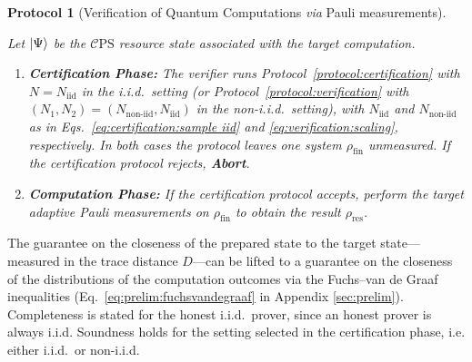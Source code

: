 \documentclass[a4paper,twocolumn,11pt,unpublished]{../../revision/quantumarticle}
\newtheorem{protocol}{Protocol}
\newcommand{\Niid}{N_{\mathrm{iid}}}
\newcommand{\Nnoniid}{N_{\mathrm{non\text{-}iid}}}
\newcommand{\mCEPS}{\mathcal{C}\text{PS}}
\begin{document}
\begin{protocol}[Verification of Quantum Computations \textit{via} Pauli measurements]
    \label{protocol:verification of UQC}

    Let $\ket\Psi$ be the $\mCEPS$ resource state associated with the target computation.

    \begin{enumerate}

        \item \textbf{Certification Phase:}
        The verifier runs Protocol~\ref{protocol:certification} with $N = \Niid$ in the i.i.d.\ setting (or Protocol~\ref{protocol:verification} with $(N_1,N_2) = (\Nnoniid,\Niid)$ in the non-i.i.d.\ setting), with $\Niid$ and $\Nnoniid$ as in Eqs.~\eqref{eq:certification:sample iid} and \eqref{eq:verification:scaling}, respectively. In both cases the protocol leaves one system $\rho_{\mathrm{fin}}$ unmeasured. If the certification protocol rejects, \textbf{Abort}.

        \item \textbf{Computation Phase:}
        If the certification protocol accepts, perform the target adaptive Pauli measurements on $\rho_{\mathrm{fin}}$ to obtain the result $\rho_{\mathrm{res}}$.

    \end{enumerate}
\end{protocol}

The guarantee on the closeness of the prepared state to the target state—measured in the trace distance $D$—can be lifted to a guarantee on the closeness of the distributions of the computation outcomes via the Fuchs--van de Graaf inequalities (Eq.~\eqref{eq:prelim:fuchsvandegraaf} in Appendix \ref{sec:prelim}).
Completeness is stated for the honest i.i.d.\ prover, since an honest prover is always i.i.d. Soundness holds for the setting selected in the certification phase, i.e. either i.i.d.\ or non-i.i.d.
\end{document}
